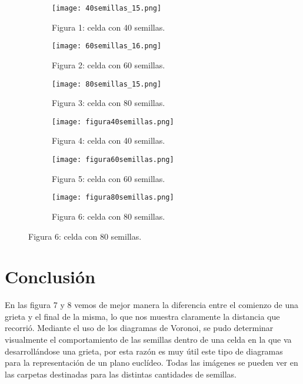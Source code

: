 \documentclass{article}
\begin{document}
\begin{figure}[H]
       \centering
       \begin{subfigure}[b]{0.45\linewidth}
           \texttt{[image: 40semillas\_15.png]}
           \caption{Figura 1: celda con 40 semillas.}
           \label{fig:westminster_lateral}
        \end{subfigure}
        \begin{subfigure}[b]{0.45\linewidth}
            \texttt{[image: 60semillas\_16.png]}
            \caption{Figura 2: celda con 60 semillas.}
            \label{fig:westminster_aerea}
        \end{subfigure}
        \begin{subfigure}[b]{0.45\linewidth}
           \texttt{[image: 80semillas\_15.png]}
           \caption{Figura 3: celda con 80 semillas.}
           \label{fig:westminster_aerea}
        \end{subfigure}
        \begin{subfigure}[b]{0.45\linewidth}
           \texttt{[image: figura40semillas.png]}
           \caption{Figura 4: celda con 40 semillas.}
           \label{fig:westminster_aerea}
        \end{subfigure}
      \begin{subfigure}[b]{0.45\linewidth}
           \texttt{[image: figura60semillas.png]}
           \caption{Figura 5: celda con 60 semillas.}
           \label{fig:westminster_aerea}
        \end{subfigure}
\begin{subfigure}[b]{0.45\linewidth}
           \texttt{[image: figura80semillas.png]}
           \caption{Figura 6: celda con 80 semillas.}
           \label{fig:westminster_aerea}
        \end{subfigure}
\end{figure}

\newpage

\section{Conclusi\'on}

En las figura 7  y 8 vemos de mejor manera la diferencia entre el comienzo de una grieta y el final de la misma, lo que nos muestra claramente la distancia que recorri\'o.
Mediante el uso de los diagramas de Voronoi, se pudo determinar visualmente el comportamiento de las semillas dentro de una celda en la que va desarroll\'andose una grieta, por esta raz\'on es muy \'util este tipo de diagramas para la representaci\'on de un plano eucl\'ideo.
Todas las im\'agenes se pueden ver \cite{yo} en las carpetas destinadas para las distintas cantidades de semillas.
\end{document}
